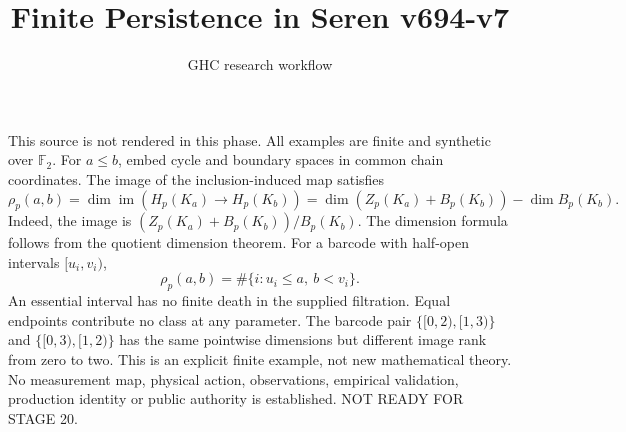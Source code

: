\documentclass{article}
\title{Finite Persistence in Seren v694-v7}
\author{GHC research workflow}
\begin{document}
\maketitle
This source is not rendered in this phase. All examples are finite and synthetic over $\mathbb F_2$.
For $a\leq b$, embed cycle and boundary spaces in common chain coordinates. The image of the inclusion-induced map satisfies
\[\rho_p(a,b)=\dim\operatorname{im}(H_p(K_a)\to H_p(K_b))
=\dim(Z_p(K_a)+B_p(K_b))-\dim B_p(K_b).\]
Indeed, the image is $(Z_p(K_a)+B_p(K_b))/B_p(K_b)$. The dimension formula follows from the quotient dimension theorem. For a barcode with half-open intervals $[u_i,v_i)$,
\[\rho_p(a,b)=\#\{i:u_i\leq a,\ b<v_i\}.\]
An essential interval has no finite death in the supplied filtration. Equal endpoints contribute no class at any parameter.
The barcode pair $\{[0,2),[1,3)\}$ and $\{[0,3),[1,2)\}$ has the same pointwise dimensions but different image rank from zero to two. This is an explicit finite example, not new mathematical theory.
No measurement map, physical action, observations, empirical validation, production identity or public authority is established. NOT READY FOR STAGE 20.
\end{document}
